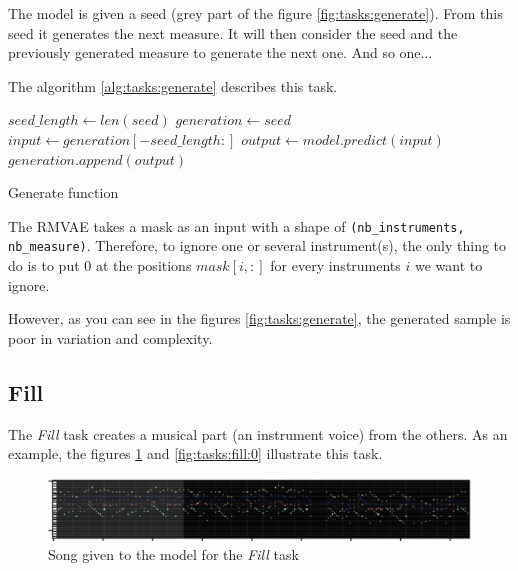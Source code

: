 \documentclass[12pt]{report}
\begin{document}
The model is given a seed (grey part of the figure \ref{fig:tasks:generate}).
From this seed it generates the next measure.
It will then consider the seed and the previously generated measure to generate the next one.
And so one...

The algorithm \ref{alg:tasks:generate} describes this task.

\begin{algorithm}
    \begin{algorithmic}[1]
        \Statex
            \State $seed\_length \gets len(seed)$
            \State $generation \gets seed$
                \State $input \gets generation[-seed\_length:]$
                \State $output \gets model.predict(input)$
                \State $generation.append(output)$
            \EndFor
            \State {}
        \EndFunction
        \end{algorithmic}
    \caption{Generate function}
    \label{alg:tasks:generate}
\end{algorithm}

The RMVAE takes a mask as an input with a shape of \texttt{(nb\_instruments, nb\_measure)}.
Therefore, to ignore one or several instrument(s), the only thing to do is to put $0$ at the positions $mask[i, :]$ for every instruments $i$ we want to ignore.

However, as you can see in the figures \ref{fig:tasks:generate}, the generated sample is poor in variation and complexity.

\subsection{Fill}
\label{sec:tasks:fill}

The \textit{Fill} task creates a musical part (an instrument voice) from the others.
As an example, the figures \ref{fig:tasks:fill:truth} and \ref{fig:tasks:fill:0} illustrate this task.

\begin{figure}[htbp]
    \centering
    \includegraphics[width=\textwidth]{images/generated_midis/tasks/fill/task-fill-truth.jpg}
    \caption{Song given to the model for the \textit{Fill} task}
    \label{fig:tasks:fill:truth}
\end{figure}
\end{document}
